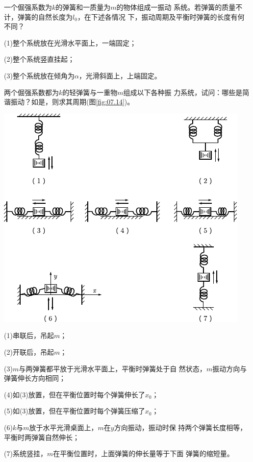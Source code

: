 \begin{questions}
\question 一个倔强系数为$ k $的弹簧和一质量为$ m $的物体组成一振动
系统。若弹簧的质量不计，弹簧的自然长度为$ l _ { 0 } $，在下述各情况
下，振动周期及平衡时弹簧的长度有何不同？

(1)整个系统放在光滑水平面上，一端固定；

(2)整个系统竖直挂起；

(3)整个系统放在倾角为$ \alpha $，光滑斜面上，上端固定。

\question 两个倔强系数都为$ k $的轻弹簧与一重物$ m $组成以下各种振
力系统，试问：哪些是简谐振动？如是，则求其周期(图\ref{fig:07.14})。
\begin{figurex}
 \centering
 \includegraphics{figure/fig07.14}
 \caption{}
 \label{fig:07.14}
\end{figurex}

\clearpage
(1)串联后，吊起$ m $；

(2)开联后，吊起$ m $；

(3)\;$ m $与两弹簧都平放于光滑水平面上，平衡时弹簧处于自
然状态，$ m $振动方向与弹簧伸长方向相同；

(4)如(3)放置，但在平衡位置时每个弹簧伸长了$ x _ 0 $；

(5)如(3)放置，但在平衡位置时每个弹簧压缩了$ x _ 0 $；

(6)\;$ k $与$ m $放于水平光滑桌面上，$ m $在$ y $方向振动，振动时保
持两个弹簧长度相等，平衡时两弹簧自然伸长；

(7)系统竖挂，$ m $在平衡位置时，上面弹簧的伸长量等于下面
弹簧的缩短量。


\end{questions}
